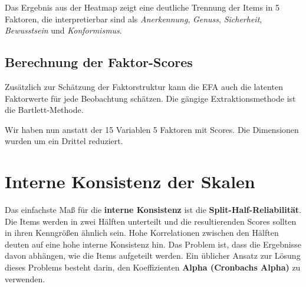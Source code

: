 \documentclass[12pt,ngerman,]{book}
\makeatletter
\newenvironment{Shaded}{\begin{snugshade}}{\end{snugshade}}
\newcommand{\KeywordTok}[1]{\textcolor[rgb]{0.13,0.29,0.53}{\textbf{{#1}}}}
\newcommand{\DataTypeTok}[1]{\textcolor[rgb]{0.13,0.29,0.53}{{#1}}}
\newcommand{\DecValTok}[1]{\textcolor[rgb]{0.00,0.00,0.81}{{#1}}}
\newcommand{\StringTok}[1]{\textcolor[rgb]{0.31,0.60,0.02}{{#1}}}
\newcommand{\CommentTok}[1]{\textcolor[rgb]{0.56,0.35,0.01}{\textit{{#1}}}}
\newcommand{\NormalTok}[1]{{#1}}
\newenvironment{kframe}{%
\medskip{}
\setlength{\fboxsep}{.8em}
 \def\at@end@of@kframe{}%
 \ifinner\ifhmode%
  \def\at@end@of@kframe{\end{minipage}}%
  \begin{minipage}{\columnwidth}%
 \fi\fi%
 \def\FrameCommand##1{\hskip\@totalleftmargin \hskip-\fboxsep
 \colorbox{shadecolor}{##1}\hskip-\fboxsep
     \hskip-\linewidth \hskip-\@totalleftmargin \hskip\columnwidth}%
 \MakeFramed {\advance\hsize-\width
   \@totalleftmargin\z@ \linewidth\hsize
   \@setminipage}}%
 {\par\unskip\endMakeFramed%
 \at@end@of@kframe}
\renewenvironment{Shaded}{\begin{kframe}}{\end{kframe}}
\makeatother
\begin{document}
Das Ergebnis aus der Heatmap zeigt eine deutliche Trennung der Items in
5 Faktoren, die interpretierbar sind als \emph{Anerkennung},
\emph{Genuss}, \emph{Sicherheit}, \emph{Bewusstsein} und
\emph{Konformismus}.

\subsection{Berechnung der
Faktor-Scores}\label{berechnung-der-faktor-scores}

Zusätzlich zur Schätzung der Faktorstruktur kann die EFA auch die
latenten Faktorwerte für jede Beobachtung schätzen. Die gängige
Extraktionsmethode ist die Bartlett-Methode.

\begin{Shaded}
\end{Shaded}

Wir haben nun anstatt der 15 Variablen 5 Faktoren mit Scores. Die
Dimensionen wurden um ein Drittel reduziert.

\section{Interne Konsistenz der
Skalen}\label{interne-konsistenz-der-skalen}

Das einfachste Maß für die \textbf{interne Konsistenz} ist die
\textbf{Split-Half-Reliabilität}. Die Items werden in zwei Hälften
unterteilt und die resultierenden Scores sollten in ihren Kenngrößen
ähnlich sein. Hohe Korrelationen zwischen den Hälften deuten auf eine
hohe interne Konsistenz hin. Das Problem ist, dass die Ergebnisse davon
abhängen, wie die Items aufgeteilt werden. Ein üblicher Ansatz zur
Lösung dieses Problems besteht darin, den Koeffizienten \textbf{Alpha
(Cronbachs Alpha)} zu verwenden.
\end{document}
